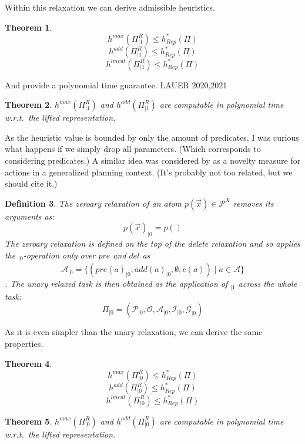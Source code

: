 \documentclass[twocolumn]{article}
\newcommand{\task}{\ensuremath{\Pi}\xspace}
\newcommand{\preds}{\ensuremath{\mathcal{P}}\xspace}
\newcommand{\acts}{\ensuremath{\mathcal{A}}\xspace}
\newcommand{\objects}{\ensuremath{\mathcal{O}}\xspace}
\newcommand{\init}{\ensuremath{\mathcal{I}}\xspace}
\newcommand{\goal}{\ensuremath{\mathcal{G}}\xspace}
\newcommand{\vars}{\ensuremath{X}\xspace}
\newcommand{\someVar}{\ensuremath{x}\xspace}
\newcommand{\atoms}{\ensuremath{\preds^{\vars}}\xspace}
\newcommand{\someAtom}{\ensuremath{p(\vec{\someVar})}\xspace}
\newcommand{\somePred}{\ensuremath{p}\xspace}
\newcommand{\prename}{\ensuremath{pre}\xspace}
\newcommand{\addname}{\ensuremath{add}\xspace}
\newcommand{\delname}{\ensuremath{del}\xspace}
\newcommand{\pre}[1]{\ensuremath{\prename(#1)}\xspace}
\newcommand{\add}[1]{\ensuremath{\addname(#1)}\xspace}
\newcommand{\cost}[1]{\ensuremath{c(#1)}\xspace}
\newcommand{\someAct}{\ensuremath{a}\xspace}
\newcommand{\optimalHeuristic}{\ensuremath{h^{*}_{Rep}}\xspace}
\newcommand{\unary}[1]{\ensuremath{#1_{|1}}\xspace}
\newcommand{\zeroary}[1]{\ensuremath{#1_{|0}}\xspace}
\newtheorem{theorem}{Theorem}
\newtheorem{definition}[theorem]{Definition}
\begin{document}
	Within this relaxation we can derive admissible heuristics.
	
	\begin{theorem}
		$$
			h^{max}(\unary{\task^{R}}) \leq \optimalHeuristic(\task)
		$$
		$$
		h^{add}(\unary{\task^{R}}) \leq \optimalHeuristic(\task)
		$$
		$$
		h^{lmcut}(\unary{\task^{R}}) \leq \optimalHeuristic(\task)
		$$
	\end{theorem}
	
	And provide a polynomial time guarantee. LAUER 2020,2021
	
	\begin{theorem}
		$
		h^{max}(\unary{\task^{R}})
		$
		and
		$
		h^{add}(\unary{\task^{R}})
		$
		are computable in polynomial time w.r.t.\ the lifted representation.
	\end{theorem}
	
	As the heuristic value is bounded by only the amount of predicates, I was curious what happens if we simply drop all parameters. 
	(Which corresponds to considering predicates.)
	A similar idea was considered by \cite{lei:etal:socs-23} as a novelty measure for actions in a generalized planning context.
	(It's probably not too related, but we should cite it.)
	
	\begin{definition}
		The zeroary relaxation of an atom $\someAtom \in \atoms$ removes its arguments as:
		$$
		\zeroary{\someAtom} =  \somePred()
		$$
		The zeroary relaxation is defined on the top of the delete relaxation and so applies the {$\zeroary{}$}-operation only over \prename and \delname as
		$$
		\zeroary{\acts} = \{(\zeroary{\pre{\someAct}}, \zeroary{\add{\someAct}}, \emptyset, \cost{\someAct}) \mid \someAct \in \acts\}
		$$.
		The unary relaxed task is then obtained as the application of $\unary{}$ across the whole task:
		$$
		\zeroary{\task} = (\zeroary{\preds}, \objects, \zeroary{\acts}, \zeroary{\init}, \zeroary{\goal})
		$$
	\end{definition}
	
	As it is even simpler than the unary relaxation, we can derive the same properties.
	
	\begin{theorem}
		$$
		h^{max}(\zeroary{\task^{R}}) \leq \optimalHeuristic(\task)
		$$
		$$
		h^{add}(\zeroary{\task^{R}}) \leq \optimalHeuristic(\task)
		$$
		$$
		h^{lmcut}(\zeroary{\task^{R}}) \leq \optimalHeuristic(\task)
		$$
	\end{theorem}
	
	\begin{theorem}
		$
		h^{max}(\zeroary{\task^{R}})
		$
		and
		$
		h^{add}(\zeroary{\task^{R}})
		$
		are computable in polynomial time w.r.t.\ the lifted representation.
	\end{theorem}
	
\end{document}
